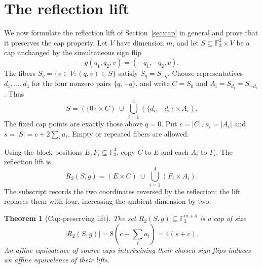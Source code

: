 \documentclass[11pt]{article}
\newcommand{\F}{\mathbb F_3}
\newtheorem{theorem}{Theorem}
\begin{document}
\section{The reflection lift}\label{sec:lifts}

We now formulate the reflection lift of Section~\ref{sec:cap} in general
and prove that it preserves the cap property.
Let $V$ have dimension $m$, and let $S\subseteq\F^2\times V$ be a cap
unchanged by the simultaneous sign flip
\[
 g(q_1,q_2,v)=(-q_1,-q_2,v).
\]
The fibers $S_q=\{v\in V:(q,v)\in S\}$ satisfy $S_q=S_{-q}$.
Choose representatives $d_1,\ldots,d_4$ for the four nonzero pairs
$\{q,-q\}$, and write $C=S_0$ and $A_i=S_{d_i}=S_{-d_i}$.
Thus
\begin{equation}\label{source}
 S=(\{0\}\times C)\ \cup\ \bigcup_{i=1}^4
       (\{d_i,-d_i\}\times A_i).
\end{equation}
The fixed cap points are exactly those above $q=0$. Put $c=|C|$,
$a_i=|A_i|$ and $s=|S|=c+2\sum_i a_i$.
Empty or repeated fibers are allowed.

Using the block positions $E,F_i\subseteq\F^4$, copy $C$ to $E$
and each $A_i$ to $F_i$. The reflection lift is
\begin{equation}\label{lift}
 R_2(S,g)=(E\times C)\ \cup\ \bigcup_{i=1}^4(F_i\times A_i).
\end{equation}
The subscript records the two coordinates reversed by the reflection;
the lift replaces them with four, increasing the ambient dimension by two.

\begin{theorem}[Cap-preserving lift]\label{thm:lift}
The set $R_2(S,g)\subseteq\F^{m+4}$ is a cap of size
\[
 |R_2(S,g)|=8\left(c+\sum_i a_i\right)=4(s+c).
\]
An affine equivalence of source caps intertwining their chosen sign flips
induces an affine equivalence of their lifts.
\end{theorem}
\end{document}
